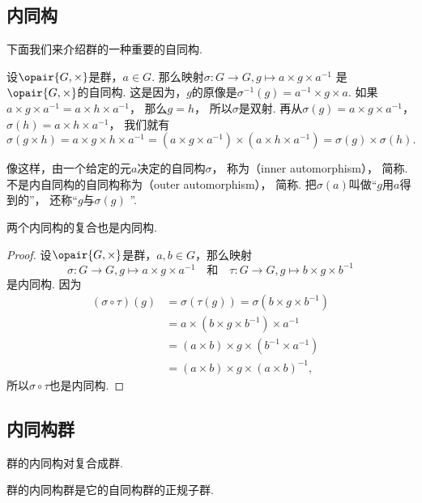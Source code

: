 \subsection{内同构}
下面我们来介绍群的一种重要的自同构.

设\(\opair{G,\times}\)是群，\(a\in G\).
那么映射\(\sigma\colon G\to G, g\mapsto a\times g\times a^{-1}\)
是\(\opair{G,\times}\)的自同构.
这是因为，\(g\)的原像是\(\sigma^{-1}(g)=a^{-1}\times g\times a\).
如果\(a\times g\times a^{-1} = a\times h\times a^{-1}\)，
那么\(g=h\)，
所以\(\sigma\)是双射.
再从\(\sigma(g)=a\times g\times a^{-1}\)，
\(\sigma(h)=a\times h\times a^{-1}\)，
我们就有\[
	\sigma(g\times h)
	= a \times g \times h \times a^{-1}
	= (a \times g \times a^{-1}) \times (a \times h \times a^{-1})
	= \sigma(g) \times \sigma(h).
\]

像这样，由一个给定的元\(a\)决定的自同构\(\sigma\)，
称为（inner automorphism），
简称.
不是内自同构的自同构称为（outer automorphism），
简称.
把\(\sigma(a)\)叫做“\(g\)用\(a\)得到的”，
还称“\(g\)与\(\sigma(g)\) ”.

\begin{theorem}
两个内同构的复合也是内同构.
\begin{proof}
设\(\opair{G,\times}\)是群，\(a,b\in G\)，那么映射\[
	\sigma\colon G\to G, g\mapsto a\times g\times a^{-1}
	\quad\text{和}\quad
	\tau\colon G\to G, g\mapsto b\times g\times b^{-1}
\]是内同构.
因为\begin{align*}
	(\sigma\circ\tau)(g)
	&=\sigma(\tau(g))
	=\sigma(b\times g\times b^{-1}) \\
	&=a\times(b\times g\times b^{-1})\times a^{-1} \\
	&=(a\times b)\times g\times(b^{-1}\times a^{-1}) \\
	&=(a\times b)\times g\times(a\times b)^{-1},
\end{align*}
所以\(\sigma\circ\tau\)也是内同构.
\end{proof}
\end{theorem}

\subsection{内同构群}
\begin{theorem}
群的内同构对复合成群.
\end{theorem}

\begin{theorem}
群的内同构群是它的自同构群的正规子群.
\end{theorem}
